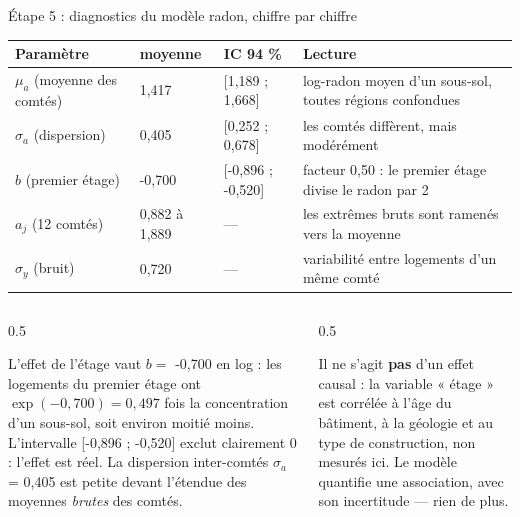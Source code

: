 \begin{frame}{Étape 5 : diagnostics du modèle radon, chiffre par chiffre}
\small
\begin{center}
\footnotesize
\begin{tabular}{@{}p{2.9cm}p{2.2cm}p{2.2cm}p{4.9cm}@{}}
\toprule
\textbf{Paramètre} & \textbf{moyenne} & \textbf{IC 94 \%} & \textbf{Lecture} \\
\midrule
$\mu_a$ (moyenne des comtés) & 1,417 & [1,189 ; 1,668] &
log-radon moyen d'un sous-sol, toutes régions confondues \\[1.5mm]
$\sigma_a$ (dispersion) & 0,405 & [0,252 ; 0,678] &
les comtés diffèrent, mais modérément \\[1.5mm]
$b$ (premier étage) & -0,700 & [-0,896 ; -0,520] &
facteur 0,50 : le premier étage divise le radon par 2 \\[1.5mm]
$a_j$ (12 comtés) & 0,882 à 1,889 & --- &
les extrêmes bruts sont ramenés vers la moyenne \\[1.5mm]
$\sigma_y$ (bruit) & 0,720 & --- &
variabilité entre logements d'un même comté \\
\bottomrule
\end{tabular}
\end{center}
\vspace{1mm}
\begin{columns}[t]
\begin{column}{0.5\textwidth}
\begin{kbox}
L'effet de l'étage vaut $b = $ -0,700 en log : les logements du premier étage
ont $\exp(-0,700) = 0,497$ fois la concentration d'un sous-sol, soit environ
moitié moins. L'intervalle [-0,896 ; -0,520] exclut clairement 0 : l'effet est réel.
La dispersion inter-comtés $\sigma_a$ = 0,405 est petite devant l'étendue
des moyennes \emph{brutes} des comtés.
\end{kbox}
\end{column}
\begin{column}{0.5\textwidth}
\begin{wbox}
Il ne s'agit \textbf{pas} d'un effet causal : la variable « étage » est corrélée à
l'âge du b\^atiment, à la géologie et au type de construction, non mesurés ici.
Le modèle quantifie une association, avec son incertitude --- rien de plus.
\end{wbox}
\end{column}
\end{columns}
\end{frame}

